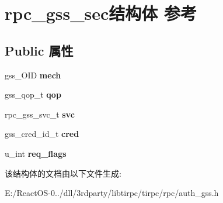 \hypertarget{structrpc__gss__sec}{}\section{rpc\+\_\+gss\+\_\+sec结构体 参考}
\label{structrpc__gss__sec}
\subsection*{Public 属性}
\begin{DoxyCompactItemize}
\item 
\mbox{\label{structrpc__gss__sec_ac5e87e7119dba4f9e6e1671010db72b4}} 
gss\+\_\+\+O\+ID {\bfseries mech}
\item 
\mbox{\label{structrpc__gss__sec_aab14f2aaf7438bf063408db829120ad2}} 
gss\+\_\+qop\+\_\+t {\bfseries qop}
\item 
\mbox{\label{structrpc__gss__sec_a35ef8426039f0a5c651621403dd42719}} 
rpc\+\_\+gss\+\_\+svc\+\_\+t {\bfseries svc}
\item 
\mbox{\label{structrpc__gss__sec_a8d97f65434c31ced09cda8971ae172d1}} 
gss\+\_\+cred\+\_\+id\+\_\+t {\bfseries cred}
\item 
\mbox{\label{structrpc__gss__sec_a300c24992ea49df62fd1c68cbf0dba7c}} 
u\+\_\+int {\bfseries req\+\_\+flags}
\end{DoxyCompactItemize}


该结构体的文档由以下文件生成\+:\begin{DoxyCompactItemize}
\item 
E\+:/\+React\+O\+S-\/0../dll/3rdparty/libtirpc/tirpc/rpc/auth\+\_\+gss.\+h\end{DoxyCompactItemize}
